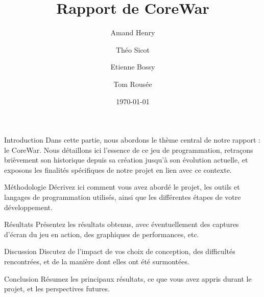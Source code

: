 \documentclass[a4paper, 10pt]{article}
\title{Rapport de CoreWar}
\author{Amand Henry\and{}Théo Sicot\and{}Etienne Bossy\and{}Tom Rousée}
\date{\today{}}
\begin{document}
    \maketitle{}
    \newpage{}
    \tableofcontents{}
    \newpage{}

    \begin{section}{Introduction}\label{sec:introduction}
        Dans cette partie, nous abordons le thème central de notre rapport : le CoreWar. Nous détaillons ici l'essence de ce jeu de programmation, retraçons brièvement son historique depuis sa création jusqu'à son évolution actuelle, et exposons les finalités spécifiques de notre projet en lien avec ce contexte.
    \end{section}

    \begin{section}{Méthodologie}\label{sec:methodologie}
        Décrivez ici comment vous avez abordé le projet, les outils et langages de programmation utilisés, ainsi que les différentes étapes de votre développement.
    \end{section}

    \begin{section}{Résultats}\label{sec:resultats}
        Présentez les résultats obtenus, avec éventuellement des captures d'écran du jeu en action, des graphiques de performances, etc.
    \end{section}

    \begin{section}{Discussion}\label{sec:discussion}
        Discutez de l'impact de vos choix de conception, des difficultés rencontrées, et de la manière dont elles ont été surmontées.
    \end{section}

    \begin{section}{Conclusion}\label{sec:conclusion}
        Résumez les principaux résultats, ce que vous avez appris durant le projet, et les perspectives futures.
    \end{section}

    
    
    
\end{document}
